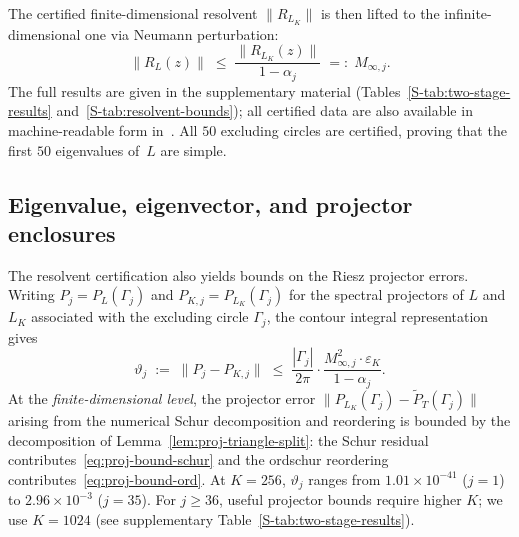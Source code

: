 The certified finite-dimensional resolvent $\|R_{L_K}\|$ is then
lifted to the infinite-dimensional one via Neumann perturbation:
\[
\|R_L(z)\| \;\leq\; \frac{\|R_{L_K}(z)\|}{1 - \alpha_j}
\;=:\; M_{\infty,j}.
\]
The full results are given in the supplementary material
(Tables~\ref{S-tab:two-stage-results} and~\ref{S-tab:resolvent-bounds});
all certified data are also available in machine-readable form
in~\cite{NisoliGKWData2026}.
All $50$ excluding circles are certified, proving that the first $50$
eigenvalues of~$L$ are simple.

\subsection{Eigenvalue, eigenvector, and projector enclosures}
\label{sec:enclosures}

The resolvent certification also yields bounds on the Riesz projector errors.
Writing $P_j = P_L(\Gamma_j)$ and $P_{K,j} = P_{L_K}(\Gamma_j)$
for the spectral projectors of $L$ and $L_K$ associated with
the excluding circle $\Gamma_j$, the contour integral representation gives
\begin{equation}
\label{eq:proj-error}
\vartheta_j \;:=\; \|P_j - P_{K,j}\|
\;\leq\; \frac{|\Gamma_j|}{2\pi} \cdot
  \frac{M_{\infty,j}^2 \cdot \varepsilon_K}{1 - \alpha_j}.
\end{equation}
At the \emph{finite-dimensional level}, the projector error
$\|P_{L_K}(\Gamma_j) - \tilde P_T(\Gamma_j)\|$ arising from the
numerical Schur decomposition and reordering is bounded by the
decomposition of Lemma~\ref{lem:proj-triangle-split}: the Schur
residual contributes~\eqref{eq:proj-bound-schur} and the ordschur
reordering contributes~\eqref{eq:proj-bound-ord}.
At $K = 256$, $\vartheta_j$ ranges from $1.01 \times 10^{-41}$ ($j = 1$)
to $2.96 \times 10^{-3}$ ($j = 35$).  For $j \geq 36$, useful
projector bounds require higher $K$; we use $K = 1024$
(see supplementary Table~\ref{S-tab:two-stage-results}).

